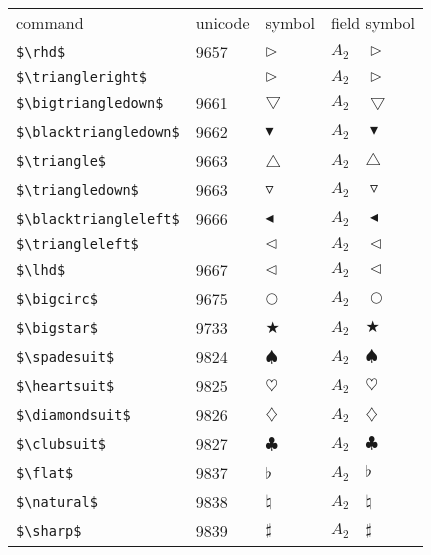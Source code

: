 \documentclass{article}
\begin{document}
\begin{table}
\begin{center}
\begin{tabular}{llll}
 command                      & unicode & symbol                & field symbol\\
 \verb#$\rhd$#                & 9657    & $\rhd$                & $A_2\quad \rhd$\\
 \verb#$\triangleright$#      &         & $\triangleright$      & $A_2\quad \triangleright$\\
 \verb#$\bigtriangledown$#    & 9661    & $\bigtriangledown$    & $A_2\quad \bigtriangledown$\\
 \verb#$\blacktriangledown$#  & 9662    & $\blacktriangledown$  & $A_2\quad \blacktriangledown$\\
 \verb#$\triangle$#           & 9663    & $\triangle$           & $A_2\quad \triangle$\\
 \verb#$\triangledown$#       & 9663    & $\triangledown$       & $A_2\quad \triangledown$\\
 \verb#$\blacktriangleleft$#  & 9666    & $\blacktriangleleft$  & $A_2\quad \blacktriangleleft$\\
 \verb#$\triangleleft$#       &         & $\triangleleft$       & $A_2\quad \triangleleft$\\
 \verb#$\lhd$#                & 9667    & $\lhd$                & $A_2\quad \lhd$\\
 \verb#$\bigcirc$#            & 9675    & $\bigcirc$            & $A_2\quad \bigcirc$\\
 \verb#$\bigstar$#            & 9733    & $\bigstar$            & $A_2\quad \bigstar$\\
 \verb#$\spadesuit$#          & 9824    & $\spadesuit$          & $A_2\quad \spadesuit$\\
 \verb#$\heartsuit$#          & 9825    & $\heartsuit$          & $A_2\quad \heartsuit$\\
 \verb#$\diamondsuit$#        & 9826    & $\diamondsuit$        & $A_2\quad \diamondsuit$\\
 \verb#$\clubsuit$#           & 9827    & $\clubsuit$           & $A_2\quad \clubsuit$\\
 \verb#$\flat$#               & 9837    & $\flat$               & $A_2\quad \flat$\\
 \verb#$\natural$#            & 9838    & $\natural$            & $A_2\quad \natural$\\
 \verb#$\sharp$#              & 9839    & $\sharp$              & $A_2\quad \sharp$\\

\end{tabular}
\end{center}
\end{table}
\end{document}
